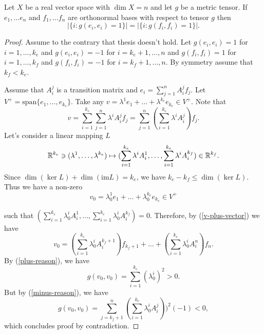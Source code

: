 \documentclass[main.tex]{subfiles}
\begin{document}
\begin{theorem}
Let $X$ be a real vector space with $\dim X = n$ and let $g$ be a metric tensor. If $e_1, \dots e_n$ and $f_1, \dots f_n$ are orthonormal bases with respect to tensor $g$ then
\begin{equation}
|\{i: g(e_i, e_i) = 1 \}| = |\{i: g(f_i, f_i) = 1 \} |.
\end{equation}
\end{theorem}
\begin{proof}
Assume to the contrary that thesis doesn't hold. Let $g(e_i, e_i)=1$ for $i=1, \dots, k_e$ and $g(e_i, e_i) = -1$ for $i=k_e + 1, \dots, n$ and $g(f_i, f_i)=1$ for $i=1, \dots, k_f$ and $g(f_i, f_i) = -1$ for $i=k_f + 1, \dots, n$. By symmetry assume that $k_f < k_e$.

Assume that $A_i^j$ is a transition matrix and $e_i = \sum_{j=1}^n A_i^j f_j$. Let $V^{+} = \text{span}\{e_1, \dots, e_{k_e}\}$. Take any  $v = \lambda^1e_1 + \dots + \lambda^{k_e}e_{k_e}\in V^{+}$. 
Note that
\begin{equation}
\label{v-plus-vector} 
v = \sum_{i=1}^{k_e} \sum_{j=1}^n \lambda^i A_i^j f_j = \sum_{j=1}^n (\sum_{i=1}^{k_e} \lambda^i A_i^j) f_j.
\end{equation}
Let's consider a linear mapping $L$
\begin{equation}
\mathbb{R}^{k_e} \ni (\lambda^1, \dots, \lambda^{k_e}) \mapsto (\sum_{i=1}^{k_e} \lambda^i A_i^1, \dots, \sum_{i=1}^{k_e} \lambda^i A_i^{k_f}) \in \mathbb{R}^{k_f}.
\end{equation}
Since $\dim(\ker L ) + \dim(\text{im} L) = k_e$, we have  $k_e - k_f \leq \dim(\ker L )$. Thus we have a non-zero 
\begin{equation}
\label{plus-reason}
v_0 = \lambda_0^1e_1 + \dots + \lambda_0^{k_e}e_{k_e}\in V^{+}
\end{equation}

such that $(\sum_{i=1}^{k_e} \lambda_0^i A_i^1, \dots, \sum_{i=1}^{k_e} \lambda_0^i A_i^{k_f}) = 0$.
Therefore, by (\ref{v-plus-vector}) we have
\begin{equation}
\label{minus-reason}
v_0 = (\sum_{i=1}^{k_e} \lambda_0^i A_i^{k_f + 1}) f_{k_f + 1} + \dots + (\sum_{i=1}^{k_e} \lambda_0^i A_i^{n}) f_n.
\end{equation}
By (\ref{plus-reason}), we have
\begin{equation}
g(v_0, v_0) = \sum_{i=1}^{k_e} (\lambda_0^i)^2 > 0.
\end{equation}
But by (\ref{minus-reason}), we have
\begin{equation}
g(v_0,v_0) = \sum_{j=k_f + 1}^n (\sum_{i=1}^{k_e} \lambda_0^i A_i^j))^2 (-1) < 0,
\end{equation}
which concludes proof by contradiction.
\end{proof}
\end{document}

